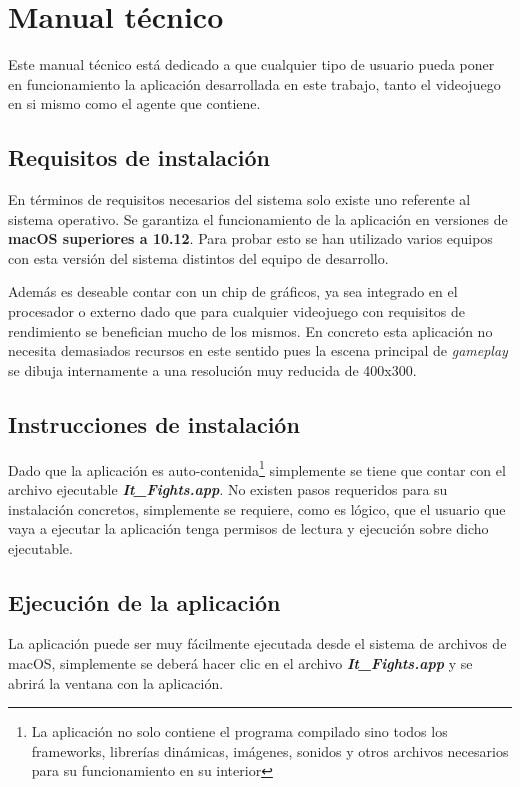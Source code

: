 \chapter{Manual técnico}


Este manual técnico está dedicado a que cualquier tipo de usuario pueda poner en funcionamiento la aplicación desarrollada en este trabajo, tanto el videojuego en si mismo como el agente que contiene. 

\section{Requisitos de instalación}

En términos de requisitos necesarios del sistema solo existe uno referente al sistema operativo. Se garantiza el funcionamiento de la aplicación en versiones de \textbf{macOS superiores a 10.12}. Para probar esto se han utilizado varios equipos con esta versión del sistema distintos del equipo de desarrollo.

\bigskip

Además es deseable contar con un chip de gráficos, ya sea integrado en el procesador o externo dado que para cualquier videojuego con requisitos de rendimiento se benefician mucho de los mismos. En concreto esta aplicación no necesita demasiados recursos en este sentido pues la escena principal de \textit{gameplay} se dibuja internamente a una resolución muy reducida de 400x300.

\section{Instrucciones de instalación}

Dado que la aplicación es auto-contenida\footnote{La aplicación no solo contiene el programa compilado sino todos los frameworks, librerías dinámicas, imágenes, sonidos y otros archivos necesarios para su funcionamiento en su interior} simplemente se tiene que contar con el archivo ejecutable \textit{\textbf{It\_Fights.app}}. No existen pasos requeridos para su instalación concretos, simplemente se requiere, como es lógico, que el usuario que vaya a ejecutar la aplicación tenga permisos de lectura y ejecución sobre dicho ejecutable.

\section{Ejecución de la aplicación}
\label{sec:ejecucion}
La aplicación puede ser muy fácilmente ejecutada desde el sistema de archivos de macOS, simplemente se deberá hacer clic en el archivo \textbf{\textit{It\_Fights.app}} y se abrirá la ventana con la aplicación.

